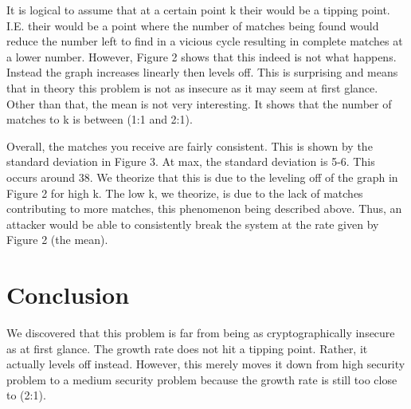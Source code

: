 \documentclass{article}
\begin{document}
      It is logical to assume that at a certain point k their would
      be a tipping point. I.E. their would be a point where the number
      of matches being found would reduce the number left to find in a
      vicious cycle resulting in complete matches at a lower number.
      However, Figure 2 shows that this indeed is not
      what happens. Instead the graph increases linearly then levels
      off. This is surprising and means that in theory this problem
      is not as insecure as it may seem at first glance. Other
      than that, the mean is not very interesting. It shows that the
      number of matches to k is between (1:1 and 2:1).

      Overall, the matches you receive are fairly consistent. This is
      shown by the standard deviation in Figure 3. At max, the standard
      deviation is 5-6. This occurs around 38. We theorize that this is
      due to the leveling off of the graph in Figure 2 for high k. The low
      k, we theorize, is due to the lack of matches contributing to more matches,
      this phenomenon being described above. Thus, an attacker would be
      able to consistently break the system at the rate given by Figure 2 (the mean).
   \section{Conclusion}
      We discovered that this problem is far from being as cryptographically
      insecure as at first glance. The growth rate does not hit a tipping
      point. Rather, it actually levels off instead. However, this merely
      moves it down from high security problem to a medium security problem
      because the growth rate is still too close to (2:1).
\end{document}
